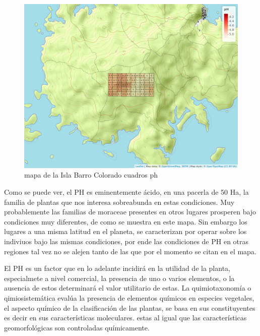 \documentclass[11pt,]{article}
\begin{document}
\begin{figure}
\centering
\includegraphics[width=1.00000\textwidth]{mapa_cuadros_ph.png}
\caption{mapa de la Isla Barro Colorado cuadros ph\label{fig:bci_map}}
\end{figure}

Como se puede ver, el PH es eminentemente ácido, en una pacerla de 50
Ha, la familia de plantas que nos interesa sobreabunda en estas
condiciones. Muy probablemente las familias de moraceae presentes en
otros lugares prosperen bajo condiciones muy diferentes, de como se
muestra en este mapa. Sin embargo los lugares a una misma latitud en el
planeta, se caracterizan por operar sobre los indiviuos bajo las mismas
condiciones, por ende las condiciones de PH en otras regiones tal vez no
se alejen tanto de las que por el momento se citan en el mapa.

El PH es un factor que en lo adelante incidirá en la utilidad de la
planta, especialmete a nivel comercial, la presencia de uno o varios
elementos, o la ausencia de estos determinará el valor utilitario de
estas. La quimiotaxonomía o qimiosistemática evalúa la presencia de
elementos químicos en especies vegetales, el aspecto químico de la
clasificación de las plantas, se basa en sus constituyentes es decir en
sus características moleculares. estas al igual que las características
geomorfológicas son controladas químicamente.
\end{document}
